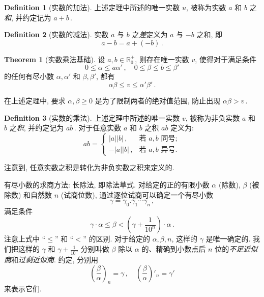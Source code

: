 \documentclass{book}
\newcommand{\abs}[1]{\left\lvert #1 \right\rvert}
\numberwithin{equation}{section}
\numberwithin{figure}{section}
\theoremstyle{definition}
\newtheorem{definition}{Definition}
\newtheorem{theorem}{Theorem}[section]
\begin{document}
\begin{definition}[实数的加法]
  上述定理中所述的唯一实数 $u$, 被称为实数 $a$ 和 $b$ 之\emph{和}, 并约定记为 $a+b$\,.
\end{definition}

\begin{definition}[实数的减法]
  实数 $a$ 与 $b$ 之\emph{差}定义为 $a$ 与 $-b$ 之和, 即
  \begin{equation*}
    a-b=a+(-b)\,.
  \end{equation*}
\end{definition}

\begin{theorem}[实数乘法基础]
  设 $a,b\in \mathbb{R}_0^+$, 则存在唯一实数 $v$, 使得对于满足条件
  \begin{equation*}
    0\leqslant \alpha\leqslant a\alpha'\,,\quad 0\leqslant \beta\leqslant b\leqslant\beta'
  \end{equation*}
  的任何有尽小数 $\alpha,\alpha'$ 和 $\beta,\beta'$, 都有
  \begin{equation*}
    \alpha\beta\leqslant v\leqslant \alpha'\beta'\,.
  \end{equation*}
\end{theorem}

在上述定理中, 要求 $\alpha,\beta\geqslant 0$ 是为了限制两者的绝对值范围, 防止出现 $\alpha\beta>v$\,. 

\begin{definition}[实数的乘法]
  上述定理中所述的唯一实数 $v$, 被称为非负实数 $a$ 和 $b$ 之\emph{积}, 并约定记为 $ab$\,. 对于任意实数 $a$ 和 $b$ 之积 $ab$ 定义为:
  \begin{equation*}
    ab=
    \begin{cases}
      \abs{a}\abs{b}\,,&\text{若 $a,b$ 同号};\\
      -\abs{a}\abs{b}\,,&\text{若 $a,b$ 异号}.
    \end{cases}
  \end{equation*}
\end{definition}
注意到, 任意实数之积是转化为非负实数之积来定义的.

有尽小数的求商方法: 长除法, 即除法草式.
对给定的正的有限小数 $\alpha$ (除数), $\beta$ (被除数) 和自然数 $n$ (试商位数), 通过逐位试商可以确定一个有尽小数
\begin{equation*}
  \gamma=\gamma_0.\gamma_1\cdots\gamma_n\,,
\end{equation*}
满足条件
\begin{equation*}
  \gamma\cdot\alpha\leqslant\beta<\left( \gamma+\frac{1}{10^n} \right)\cdot\alpha\,.
\end{equation*}
注意上式中 ``$\leqslant$'' 和 ``$<$'' 的区别. 对于给定的 $\alpha,\beta,n$, 这样的 $\gamma$ 是唯一确定的.
我们把这样的 $\gamma$ 和 $\gamma+\tfrac{1}{10^n}$ 分别叫做 $\beta$ 除以 $\alpha$ 的、精确到小数点后 $n$ 位的\emph{不足近似商}和\emph{过剩近似商}.
约定, 分别用
\begin{equation*}
  \left( \frac{\beta}{\alpha} \right)_n=\gamma\,,\quad\left( \frac{\beta}{\alpha} \right)'_n=\gamma'
\end{equation*}
来表示它们.
\end{document}
